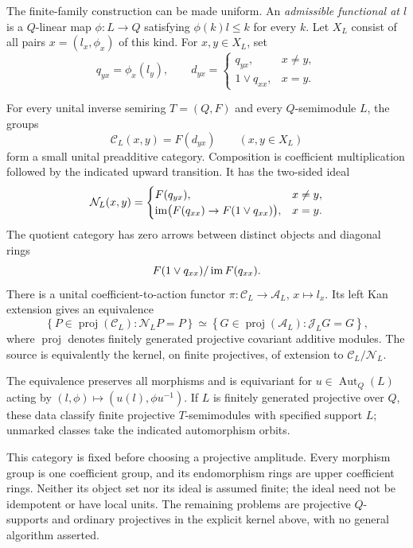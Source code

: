 The finite-family construction can be made uniform. An
\emph{admissible functional at $l$} is a $Q$-linear map
$\phi:L\to Q$ satisfying $\phi(k)l\leq k$ for every $k$.
Let $X_L$ consist of all pairs $x=(l_x,\phi_x)$ of this kind.
For $x,y\in X_L$, set
\[
 q_{yx}=\phi_x(l_y),\qquad
 d_{yx}=\begin{cases}q_{yx},&x\ne y,\\1\vee q_{xx},&x=y.\end{cases}
\]

\begin{theorem}
\label{thm:uniform-coefficient-category}
For every unital inverse semiring $T=(Q,F)$ and every
$Q$-semimodule $L$, the groups
\[
 \mathcal C_L(x,y)=F(d_{yx})\qquad(x,y\in X_L)
\]
form a small unital preadditive category. Composition is
coefficient multiplication followed by the indicated upward
transition. It has the two-sided ideal
\[
 \mathcal N_L(x,y)=
 \begin{cases}
 F(q_{yx}),&x\ne y,\\
 \operatorname{im}\bigl(F(q_{xx})\to F(1\vee q_{xx})\bigr),&x=y.
 \end{cases}
\]
The quotient category has zero arrows between distinct objects
and diagonal rings
\[
 F(1\vee q_{xx})/\operatorname{im} F(q_{xx}).
\]
There is a unital coefficient-to-action functor
$\pi:\mathcal C_L\to\mathcal A_L$, $x\mapsto l_x$.
Its left Kan extension gives an equivalence
\[
 \left\{P\in\operatorname{proj}(\mathcal C_L):
                  \mathcal N_LP=P\right\}
 \simeq
 \left\{G\in\operatorname{proj}(\mathcal A_L):
                  \mathcal J_LG=G\right\},
\]
where $\operatorname{proj}$ denotes finitely generated
projective covariant additive modules. The source is equivalently
the kernel, on finite projectives, of extension to
$\mathcal C_L/\mathcal N_L$.

The equivalence preserves all morphisms and is equivariant for
$u\in\operatorname{Aut}_Q(L)$ acting by
$(l,\phi)\mapsto(u(l),\phi u^{-1})$. If $L$ is finitely
generated projective over $Q$, these data classify finite
projective $T$-semimodules with specified support $L$;
unmarked classes take the indicated automorphism orbits.
\end{theorem}

This category is fixed before choosing a projective amplitude.
Every morphism group is one coefficient group, and its
endomorphism rings are upper coefficient rings. Neither its
object set nor its ideal is assumed finite; the ideal need
not be idempotent or have local units. The remaining problems
are projective $Q$-supports and ordinary projectives in the
explicit kernel above, with no general algorithm asserted.
